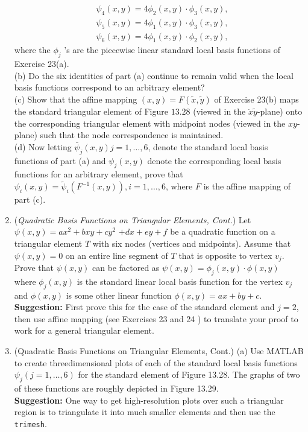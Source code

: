 \documentclass[../main.tex]{subfiles}
\begin{document}
\begin{enumerate}
$$\begin{aligned}
&\psi_{4}(x, y)=4 \phi_{2}(x, y) \cdot \phi_{3}(x, y), \\
&\psi_{5}(x, y)=4 \phi_{1}(x, y) \cdot \phi_{3}(x, y), \\
&\psi_{6}(x, y)=4 \phi_{1}(x, y) \cdot \phi_{2}(x, y),
\end{aligned}
$$
where the $\phi_{j}$ 's are the piecewise linear standard local basis functions of Exercise 23(a).
\\
(b) Do the six identities of part (a) continue to remain valid when the local basis functions correspond to an arbitrary element?
\\
(c) Show that the affine mapping $(x, y)=F(\tilde{x}, \tilde{y})$ of Exercise 23(b) maps the standard triangular element of Figure $13.28$ (viewed in the $\ddot{x} \tilde{y}$-plane) onto the corresponding triangular element with midpoint nodes (viewed in the $x y$-plane) such that the node correspondence is maintained.
\\
(d) Now letting $\bar{\psi}_{j}(x, y) j=1, \ldots, 6$, denote the standard local basis functions of part (a) and $\psi_{j}(x, y)$ denote the corresponding local basis functions for an arbitrary element, prove that $\psi_{i}(x, y)=\tilde{\psi}_{i}\left(F^{-1}(x, y)\right), i=1, \ldots, 6$, where $F$ is the affine mapping of part (c).
	\item (\textit{Quadratic Basis Functions on Triangular Elements, Cont.}) Let $\psi(x, y)=a x^{2}+b x y+c y^{2}$ $+d x+e y+f$ be a quadratic function on a triangular element $T$ with six nodes (vertices and midpoints). Assume that $\psi(x, y)=0$ on an entire line segment of $T$ that is opposite to vertex $v_{j}$. Prove that $\psi(x, y)$ can be factored as $\psi(x, y)=\phi_{j}(x, y) \cdot \phi(x, y)$ where $\phi_{j}(x, y)$ is the standard linear local basis function for the vertex $v_{j}$ and $\phi(x, y)$ is some other linear function $\phi(x, y)=a x+b y+c$.
\\
\textbf{Suggestion:} First prove this for the case of the standard element and $j=2$, then use affine mapping (see Exercises 23 and 24 ) to translate your proof to work for a general triangular element.
	\item (Quadratic Basis Functions on Triangular Elements, Cont.) (a) Use MATLAB to create threedimensional plots of each of the standard local basis functions $\psi_{j}(j=1, \ldots, 6)$ for the standard element of Figure 13.28. The graphs of two of these functions are roughly depicted in Figure 13.29.
	\\
\textbf{Suggestion:} One way to get high-resolution plots over such a triangular region is to triangulate it into much smaller elements and then use the \texttt{trimesh}.

\end{enumerate}
\end{document}
